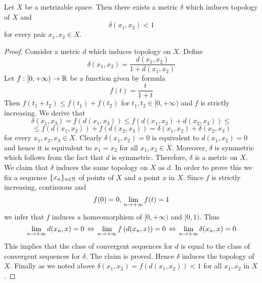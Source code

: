 \begin{proposition}\label{proposition:each_metrizable_space_has_bounded_metric}
Let $X$ be a metrizable space. Then there exists a metric $\delta$ which induces topology of $X$ and
$$\delta(x_1,x_2) < 1$$
for every pair $x_1,x_2\in X$.
\end{proposition}
\begin{proof}
Consider a metric $d$ which induces topology on $X$. Define
$$\delta(x_1,x_2) = \frac{d(x_1,x_2)}{1 + d(x_1,x_2)}$$
Let $f:[0,+\infty)\rightarrow {\mathbb R}$ be a function given by formula 
$$f(t) = \frac{t}{1+t}$$
Then $f(t_1+t_2) \leq f(t_1) + f(t_2)$ for $t_1,t_2 \in [0,+\infty)$ and $f$ is strictly increasing. We derive that
$$\delta(x_1,x_3) = f\left(d(x_1,x_3)\right) \leq f\left(d(x_1,x_2) + d(x_2,x_3)\right) \leq$$
$$\leq f\left(d(x_1,x_2)\right) + f\left(d(x_2,x_3)\right) = \delta(x_1,x_2) + \delta(x_2,x_3)$$
for every $x_1,x_2,x_3\in X$. Clearly $\delta(x_1,x_2) = 0$ is equivalent to $d(x_1,x_2) = 0$ and hence it is equivalent to $x_1 = x_2$ for all $x_1,x_2\in X$. Moreover, $\delta$ is symmetric which follows from the fact that $d$ is symmetric. Therefore, $\delta$ is a metric on $X$. We claim that $\delta$ induces the same topology on $X$ as $d$. In order to prove this we fix a sequence $\{x_n\}_{n\in {\mathbb N}}$ of points of $X$ and a point $x$ in $X$. Since $f$ is strictly increasing, continuous and
$$f(0) = 0,\,\lim_{n\rightarrow +\infty}f(t) = 1$$
we infer that $f$ induces a homeomorphism of $[0,+\infty)$ and $[0,1)$. Thus
$$\lim_{n\rightarrow +\infty}d(x_n,x) = 0\,\Leftrightarrow\, \lim_{n\rightarrow +\infty}f\left(d(x_n,x)\right) = 0\,\Leftrightarrow\,\lim_{n\rightarrow +\infty}\delta(x_n,x) = 0$$
This implies that the class of convergent sequences for $d$ is equal to the class of convergent sequences for $\delta$. The claim is proved. Hence $\delta$ induces the topology of $X$. Finally as we noted above $\delta(x_1,x_2) = f\left(d(x_1,x_2)\right) < 1$ for all $x_1,x_2$ in $X$.
\end{proof}

